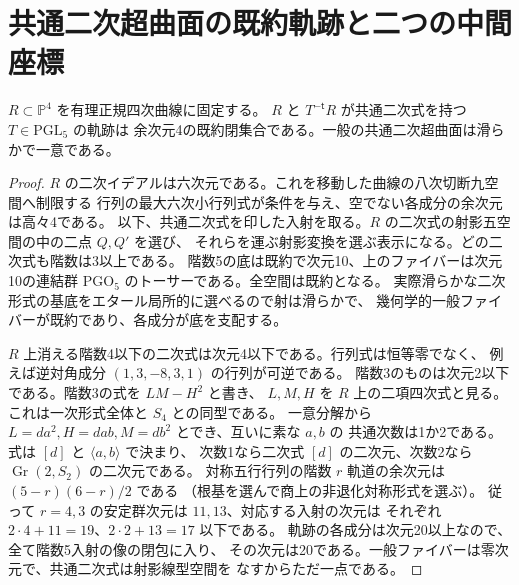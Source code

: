 \section{共通二次超曲面の既約軌跡と二つの中間座標}
\label{sec:trisecant-common-quadric-locus}
\begin{proposition}\label{prop:trisecant-common-quadric-locus}
$R\subset\mathbb P^4$ を有理正規四次曲線に固定する。
$R$ と $T^{-\mathsf t}R$ が共通二次式を持つ $T\in\mathrm{PGL}_5$ の軌跡は
余次元4の既約閉集合である。一般の共通二次超曲面は滑らかで一意である。
\end{proposition}
\begin{proof}
$R$ の二次イデアルは六次元である。これを移動した曲線の八次切断九空間へ制限する
行列の最大六次小行列式が条件を与え、空でない各成分の余次元は高々4である。
以下、共通二次式を印した入射を取る。$R$ の二次式の射影五空間の中の二点 $Q,Q'$ を選び、
それらを運ぶ射影変換を選ぶ表示になる。どの二次式も階数は3以上である。
階数5の底は既約で次元10、上のファイバーは次元10の連結群
$\mathrm{PGO}_5$ のトーサーである。全空間は既約となる。
実際滑らかな二次形式の基底をエタール局所的に選べるので射は滑らかで、
幾何学的一般ファイバーが既約であり、各成分が底を支配する。

$R$ 上消える階数4以下の二次式は次元4以下である。行列式は恒等零でなく、
例えば逆対角成分 $(1,3,-8,3,1)$ の行列が可逆である。
階数3のものは次元2以下である。階数3の式を $LM-H^2$ と書き、
$L,M,H$ を $R$ 上の二項四次式と見る。これは一次形式全体と $S_4$ との同型である。
一意分解から $L=d a^2,H=d ab,M=d b^2$ とでき、互いに素な $a,b$ の
共通次数は1か2である。式は $[d]$ と $\langle a,b\rangle$ で決まり、
次数1なら二次式 $[d]$ の二次元、次数2なら $\operatorname{Gr}(2,S_2)$ の二次元である。
対称五行行列の階数 $r$ 軌道の余次元は $(5-r)(6-r)/2$ である
（根基を選んで商上の非退化対称形式を選ぶ）。
従って $r=4,3$ の安定群次元は $11,13$、対応する入射の次元は
それぞれ $2\cdot4+11=19$、$2\cdot2+13=17$ 以下である。
軌跡の各成分は次元20以上なので、全て階数5入射の像の閉包に入り、
その次元は20である。一般ファイバーは零次元で、共通二次式は射影線型空間を
なすからただ一点である。
\end{proof}

